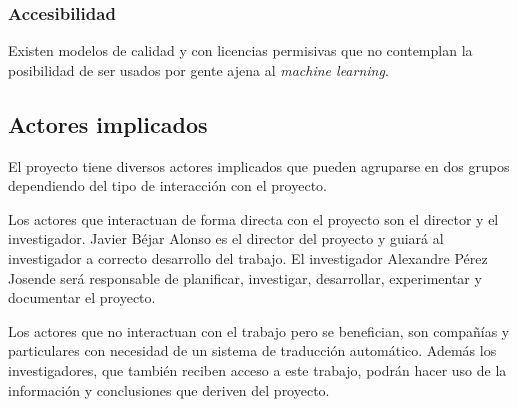 \subsubsection*{Accesibilidad}
Existen modelos de calidad y con licencias permisivas que no contemplan la posibilidad de
ser usados por gente ajena al \textit{machine learning}.


\subsection{Actores implicados}
El proyecto tiene diversos actores implicados que pueden agruparse en dos grupos dependiendo
del tipo de interacción con el proyecto.

Los actores que interactuan de forma directa con el proyecto son el director y el investigador.
Javier Béjar Alonso es el director del proyecto y guiará al investigador a correcto desarrollo
del trabajo. El investigador Alexandre Pérez Josende será responsable de planificar, investigar,
desarrollar, experimentar y documentar el proyecto.

Los actores que no interactuan con el trabajo pero se benefician, son compañías y particulares
con necesidad de un sistema de traducción automático. Además los investigadores, que también reciben
acceso a este trabajo, podrán hacer uso de la información y conclusiones que deriven del proyecto.